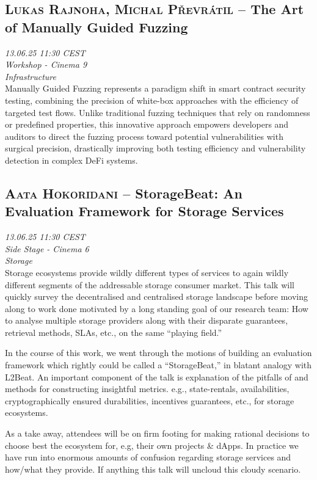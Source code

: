 \clearpage
\subsection {\textsc{Lukas Rajnoha, Michal Převrátil}  -- The Art of Manually Guided Fuzzing} \noindent \textit {13.06.25 11:30 CEST\\ Workshop - Cinema 9\\ Infrastructure}\\[1em] Manually Guided Fuzzing represents a paradigm shift in smart contract security testing, combining the precision of white-box approaches with the efficiency of targeted test flows. Unlike traditional fuzzing techniques that rely on randomness or predefined properties, this innovative approach empowers developers and auditors to direct the fuzzing process toward potential vulnerabilities with surgical precision, drastically improving both testing efficiency and vulnerability detection in complex DeFi systems.

\clearpage
\subsection {\textsc{Aata Hokoridani}  -- StorageBeat: An Evaluation Framework for Storage Services} \noindent \textit {13.06.25 11:30 CEST\\ Side Stage - Cinema 6\\ Storage}\\[1em] Storage ecosystems provide wildly different types of services to again wildly different segments of the addressable storage consumer market. This talk will quickly survey the decentralised and centralised storage landscape before moving along to work done motivated by a long standing goal of our research team: How to analyse multiple storage providers along with their disparate guarantees, retrieval methods, SLAs, etc., on the same ``playing field.''

In the course of this work, we went through the motions of building an evaluation framework which rightly could be called a ``StorageBeat,'' in blatant analogy with L2Beat. An important component of the talk is explanation of the pitfalls of and methods for constructing insightful metrics. e.g., state-rentals, availabilities, cryptographically ensured durabilities, incentives guarantees, etc., for storage ecosystems.

As a take away, attendees will be on firm footing for making rational decisions to choose best the ecosystem for, e.g, their own projects \& dApps. In practice we have run into enormous amounts of confusion regarding storage services and how/what they provide. If anything this talk will uncloud this cloudy scenario.

